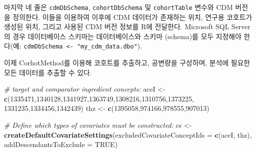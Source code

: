 \documentclass[11pt]{book}
\newenvironment{Shaded}{\begin{snugshade}}{\end{snugshade}}
\newcommand{\KeywordTok}[1]{\textcolor[rgb]{0.13,0.29,0.53}{\textbf{#1}}}
\newcommand{\DataTypeTok}[1]{\textcolor[rgb]{0.13,0.29,0.53}{#1}}
\newcommand{\DecValTok}[1]{\textcolor[rgb]{0.00,0.00,0.81}{#1}}
\newcommand{\StringTok}[1]{\textcolor[rgb]{0.31,0.60,0.02}{#1}}
\newcommand{\CommentTok}[1]{\textcolor[rgb]{0.56,0.35,0.01}{\textit{#1}}}
\newcommand{\OtherTok}[1]{\textcolor[rgb]{0.56,0.35,0.01}{#1}}
\newcommand{\NormalTok}[1]{#1}
\theoremstyle{definition}
\theoremstyle{definition}
\theoremstyle{definition}
\theoremstyle{remark}
\begin{document}
마지막 네 줄은 \texttt{cdmDbSchema}, \texttt{cohortDbSchema} 및
\texttt{cohortTable} 변수와 CDM 버전을 정의한다. 이들을 이용하여 이후에
CDM 데이터가 존재하는 위치, 연구용 코호트가 생성된 위치, 그리고 사용된
CDM 버전 정보를 R에 전달한다. Microsoft SQL Server의 경우 데이터베이스
스키마는 데이터베이스와 스키마 (schema)를 모두 지정해야 한다(예:
\texttt{cdmDbSchema\ \textless{}-\ "my\_cdm\_data.dbo"}).

이제 CorhotMethod를 이용해 코호트를 추출하고, 공변량을 구성하며, 분석에
필요한 모든 데이터를 추출할 수 있다.

\begin{Shaded}
\begin{Highlighting}[]
\CommentTok{# target and comparator ingredient concepts:}
\NormalTok{aceI <-}\StringTok{ }\KeywordTok{c}\NormalTok{(}\DecValTok{1335471}\NormalTok{,}\DecValTok{1340128}\NormalTok{,}\DecValTok{1341927}\NormalTok{,}\DecValTok{1363749}\NormalTok{,}\DecValTok{1308216}\NormalTok{,}\DecValTok{1310756}\NormalTok{,}\DecValTok{1373225}\NormalTok{,}
          \DecValTok{1331235}\NormalTok{,}\DecValTok{1334456}\NormalTok{,}\DecValTok{1342439}\NormalTok{)}
\NormalTok{thz <-}\StringTok{ }\KeywordTok{c}\NormalTok{(}\DecValTok{1395058}\NormalTok{,}\DecValTok{974166}\NormalTok{,}\DecValTok{978555}\NormalTok{,}\DecValTok{907013}\NormalTok{)}

\CommentTok{# Define which types of covariates must be constructed:}
\NormalTok{cs <-}\StringTok{ }\KeywordTok{createDefaultCovariateSettings}\NormalTok{(}\DataTypeTok{excludedCovariateConceptIds =} \KeywordTok{c}\NormalTok{(aceI,}
\NormalTok{                                                                     thz),}
                                     \DataTypeTok{addDescendantsToExclude =} \OtherTok{TRUE}\NormalTok{)}


\end{Highlighting}
\end{Shaded}
\end{document}
